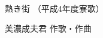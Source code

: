 \documentclass[10pt,b5j]{tarticle} %
\begin{document}
\begin{minipage}[c]{0.7\hsize} %
    \begin{center}
        {\LARGE
            熱き街 %
        }
        {\small 
            （平成4年度寮歌） %
        }
    \end{center}
\end{minipage}
\begin{minipage}[c]{0.3\hsize} %
    \begin{flushright} %
        美濃成夫君 作歌・作曲 %
    \end{flushright}
\end{minipage}
\end{document}
